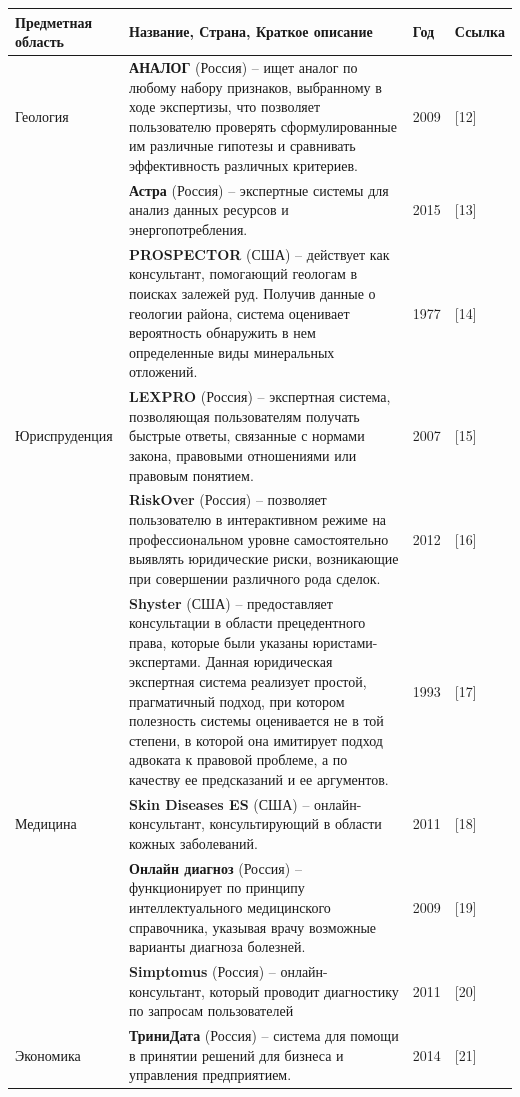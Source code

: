 \documentclass[14pt,a4paper,report]{report}
\begin{document}
\begin{table}[h!]
	\centering
	\bgroup
	\def\arraystretch{1}
	\begin{tabular}{ | P{3cm} | P{8cm} | P{2cm} | P{2cm} | }
		\hline
		Предметная область & Название, Страна, Краткое описание & Год & Ссылка 
		\\ \hline
		
		Геология & \textbf{АНАЛОГ} (Россия) -- ищет аналог по любому набору признаков, выбранному в ходе экспертизы, что позволяет пользователю проверять сформулированные им различные гипотезы и сравнивать эффективность различных критериев. & 2009 & [12] \\ \hline
		& \textbf{Астра} (Россия) -- экспертные системы для анализ данных ресурсов и энергопотребления. & 2015 & [13] \\ \hline
		& \textbf{PROSPECTOR} (США) -- действует как консультант, помогающий геологам в поисках залежей руд. Получив данные о геологии района, система оценивает вероятность обнаружить в нем определенные виды минеральных отложений. & 1977 & [14] \\ \hline
		
		Юриспруденция & \textbf{LEXPRO} (Россия) -- экспертная система, позволяющая пользователям получать быстрые ответы, связанные с нормами закона, правовыми отношениями или правовым понятием. & 2007 & [15] \\ \hline
		& \textbf{RiskOver} (Россия) -- позволяет пользователю в интерактивном режиме на профессиональном уровне самостоятельно выявлять юридические риски, возникающие при совершении различного рода сделок. & 2012 & [16] \\ \hline
		& \textbf{Shyster} (США) -- предоставляет консультации в области прецедентного права, которые были указаны юристами-экспертами. Данная юридическая экспертная система реализует простой, прагматичный подход, при котором полезность системы оценивается не в той степени, в которой она имитирует подход адвоката к правовой проблеме, а по качеству ее предсказаний и ее аргументов. & 1993 & [17] \\ \hline
		 
		Медицина & \textbf{Skin Diseases ES} (США) -- онлайн-консультант, консультирующий в области кожных заболеваний. & 2011 & [18] \\ \hline
		& \textbf{Онлайн диагноз} (Россия) -- функционирует по принципу интеллектуального медицинского справочника, указывая врачу возможные варианты диагноза болезней. & 2009 & [19] \\ \hline
		& \textbf{Simptomus} (Россия) -- онлайн-консультант, который проводит диагностику по запросам пользователей & 2011 & [20] \\ \hline
		
		Экономика & \textbf{ТриниДата} (Россия) -- система для помощи в принятии решений для бизнеса и управления предприятием. & 2014 & [21] \\ \hline
		
	\end{tabular}
	\egroup
\end{table}
\end{document}
